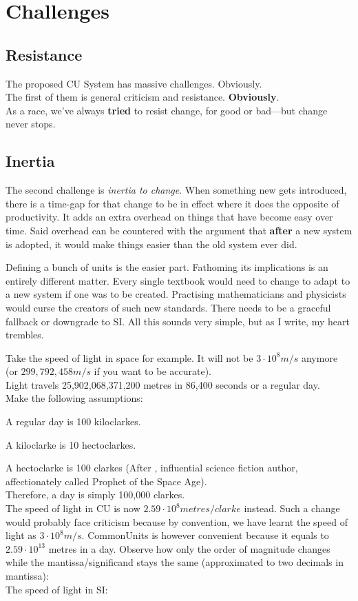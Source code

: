 \chapter{Challenges}
\section{Resistance}

The proposed CU System has massive challenges. Obviously.\\
The first of them is general criticism and resistance. \textbf{Obviously}.\\
As a race, we've always \textbf{tried} to resist change, for good or bad—but change never stops.

\section{Inertia}
The second challenge is \textit{inertia to change}. When something new gets introduced, there is a time-gap for that change to be in effect where it does the opposite of productivity.
It adds an extra overhead on things that have become easy over time. Said overhead can be countered with the argument that \textbf{after} a new system is adopted, it would make things easier than the old system ever did.

Defining a bunch of units is the easier part. Fathoming its implications is an entirely different matter.
Every single textbook would need to change to adapt to a new system if one was to be created.
Practising mathematicians and physicists would curse the creators of such new standards.
There needs to be a graceful fallback or downgrade to SI\@.
All this sounds very simple, but as I write, my heart trembles.

Take the speed of light in space for example. It will not be \(3\cdot10^8m/s\) anymore (or \(299,792,458m/s\) if you want to be accurate).\\
Light travels 25,902,068,371,200 metres in 86,400 seconds or a regular day.\\
Make the following assumptions:

A regular day is 100 kiloclarkes.

A kiloclarke is 10 hectoclarkes.

A hectoclarke is 100 clarkes (After , influential science fiction author, affectionately called Prophet of the Space Age).\\
Therefore, a day is simply 100,000 clarkes.\\
The speed of light in CU is now \(2.59\cdot10^8 metres/clarke\) instead.
Such a change would probably face criticism because by convention, we have learnt the speed of light as \(3\cdot10^8m/s\).
CommonUnits is however convenient because it equals to \(2.59\cdot10^{13}\) metres in a day. Observe how only the order of magnitude changes while the mantissa/significand stays the same (approximated to two decimals in mantissa):
\\
The speed of light in SI\@:


